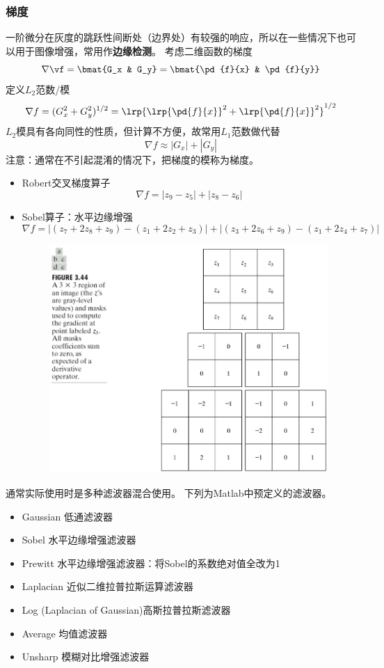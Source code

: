 \subsubsection{梯度}
一阶微分在灰度的跳跃性间断处（边界处）有较强的响应，所以在一些情况下也可以用于图像增强，常用作\textbf{边缘检测}。
考虑二维函数的梯度
\[\nabla\vf=\bmat{G_x & G_y}=\bmat{\pd{f}{x} & \pd{f}{y}}\]
定义$L_2$范数/模
\[\nabla f=(G_x^2+G_y^2)^{1/2}=\lrp{\lrp{\pd{f}{x}}^2+\lrp{\pd{f}{x}}^2}^{1/2}\]
$L_2$模具有各向同性的性质，但计算不方便，故常用$L_1$范数做代替
\[\nabla f\approx |G_x|+|G_y|\]
注意：通常在不引起混淆的情况下，把梯度的模称为梯度。
\begin{itemize}
\item Robert交叉梯度算子
\[\nabla f=|z_9-z_5|+|z_8-z_6|\]
\item Sobel算子：水平边缘增强
\[\nabla f=|(z_7+2z_8+z_9)-(z_1+2z_2+z_3)|+|(z_3+2z_6+z_9)-(z_1+2z_4+z_7)|\]
\begin{figure}[H]
\centering
\includegraphics[width=0.4\linewidth]{fig/sobel_and_robert.png}
\end{figure}
\end{itemize}

通常实际使用时是多种滤波器混合使用。
下列为Matlab中预定义的滤波器。
\begin{itemize}
\item Gaussian 低通滤波器
\item Sobel 水平边缘增强滤波器
\item Prewitt 水平边缘增强滤波器：将Sobel的系数绝对值全改为1
\item Laplacian 近似二维拉普拉斯运算滤波器
\item Log (Laplacian of Gaussian)高斯拉普拉斯滤波器
\item Average 均值滤波器
\item Unsharp 模糊对比增强滤波器
\end{itemize}